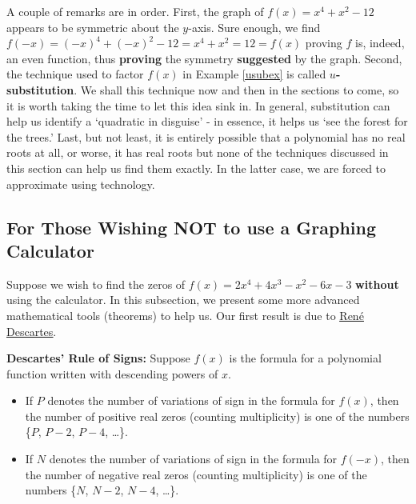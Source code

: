 \begin{ex}
\begin{enumerate}
\end{enumerate}

\label{usubex}

\end{ex}

A couple of remarks are in order.  First, the graph of $f(x) = x^4 + x^2 - 12$ appears to be symmetric about the $y$-axis.  Sure enough, we find $f(-x) = (-x)^4+(-x)^2  - 12 = x^4+x^2=12 = f(x)$ proving $f$ is, indeed, an even function, thus \textbf{proving} the symmetry \textbf{suggested} by the graph.  Second, the technique used to factor $f(x)$ in Example \ref{usubex} is called  \textbf{{\boldmath $u$}-substitution}.  We shall this technique now and then in the sections to come, so it is worth taking the time to let this idea sink in.  In general, substitution can help us identify a `quadratic in disguise' - in essence, it helps us `see the forest for the trees.'  Last, but not least, it is entirely possible that a polynomial has no real roots at all, or worse, it has real roots but none of the techniques discussed in this section can help us find them exactly.  In the latter case, we are forced to approximate using technology.  


\subsection{For Those Wishing NOT to use a Graphing Calculator}

Suppose we wish to find the zeros of $f(x) = 2x^4+4x^3-x^2-6x-3$ \textbf{without} using the calculator.  In this subsection, we present some more advanced mathematical tools (theorems) to help us.  Our first result is due to \href{http://en.wikipedia.org/wiki/Descartes}{\underline{Ren\'{e} Descartes}}.

\smallskip

\colorbox{ResultColor}{\bbm

\begin{thm} \label{DRS}  \textbf{Descartes' Rule of Signs:}  Suppose $f(x)$ is the formula for a polynomial function written with descending powers of $x$.

\begin{itemize}

\item If $P$ denotes the number of variations of sign in the formula for $f(x)$, then the number of positive real zeros (counting multiplicity) is one of the numbers \{$P$, $P-2$, $P-4$, \ldots \}.

\item If $N$ denotes the number of variations of sign in the formula for $f(-x)$, then the number of negative real zeros (counting multiplicity) is one of the numbers \{$N$, $N-2$, $N-4$, \dots\}.

\end{itemize}

\end{thm}
\ebm}

